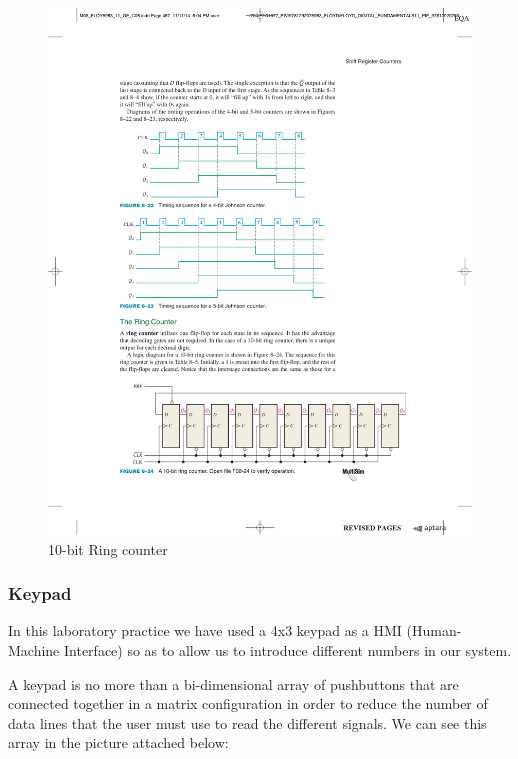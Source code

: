 \begin{figure}[H]
    \centering
    \includegraphics[scale = 0.8]{Graphics/Practice 5/COUNTERS/RING_COUNTER.pdf}
    \caption{10-bit Ring counter ~\autocite{FLOYD}}
    \label{fig:RING_10bit}
\end{figure}

\clearpage

\subsubsection{Keypad}
\label{sec:KEYPAD}

In this laboratory practice we have used a 4x3 keypad as a HMI (Human-Machine Interface) so as to allow us to introduce different numbers in our system.\medskip

A keypad is no more than a bi-dimensional array of pushbuttons that are connected together in a matrix configuration in order to reduce the number of data lines that the user must use to read the different signals. We can see this array in the picture attached below:


